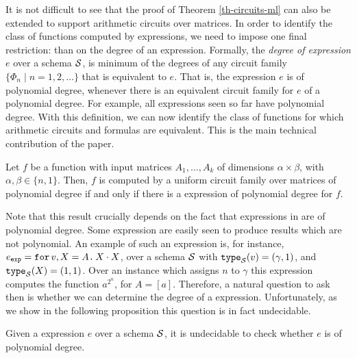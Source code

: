 
It is not difficult to see that the proof of Theorem \ref{th-circuits-ml} can also be extended to support arithmetic circuits over matrices. In order to identify the class of functions computed by \langfor expressions, we need to impose one final restriction: than on the degree of an expression. Formally, the \textit{degree of \langfor expression $e$} over a schema $\mathcal{S}$, is minimum of the degrees of any circuit family  $\{\Phi_n\mid n=1,2,\ldots\}$ that is equivalent to $e$. That is, the expression $e$ is of polynomial degree, whenever there is an equivalent circuit family for $e$ of a polynomial degree.  
For example, all \langfor expressions seen so far have polynomial degree.
With this definition, we can now identify the class of functions for which arithmetic circuits and \langfor formulas are equivalent. This is the main technical contribution of the paper. 

\begin{corollary}
\label{th-equivalence}
Let $f$ be a function with input matrices $A_1,\ldots ,A_k$ of dimensions $\alpha\times \beta$, with $\alpha,\beta \in \{n,1\}$. Then, $f$ is computed by a uniform circuit family over matrices of polynomial degree if and only if there is a \langfor expression of polynomial degree for $f$. 
\end{corollary}

Note that this result crucially depends on the fact that expressions in \langfor are of polynomial degree. Some \langfor expression are easily seen to produce results which are not polynomial. An example of such an expression is, for instance, $e_{\texttt{exp}} = \texttt{for}\, v,X=A \texttt{.}\, X\cdot X$, over a schema $\mathcal{S}$ with $\texttt{type}_{\mathcal{S}}(v)= (\gamma,1)$, and $\texttt{type}_{\mathcal{S}}(X)=(1,1)$. Over an instance which assigns $n$ to $\gamma$ this expression computes the function $a^{2^n}$, for $A=[a]$. Therefore, a natural question to ask then is whether we can determine the degree of a \langfor expression. Unfortunately, as we show in the following proposition this question is in fact undecidable.

\begin{proposition}
\label{prop-undec}
Given a \langfor expression $e$ over a schema $\mathcal{S}$, it is undecidable to check whether $e$ is of polynomial degree.
\end{proposition}


